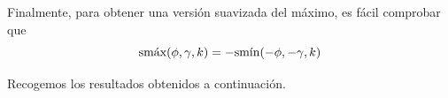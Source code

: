 Finalmente, para obtener una versión suavizada del máximo, es fácil comprobar que 
\begin{equation*}
    \smax(\phi,\gamma,k) =  - \smin(-\phi,-\gamma,k)
\end{equation*}

Recogemos los resultados obtenidos a continuación.









